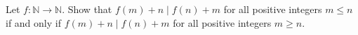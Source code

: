 Let $f:\mathbb N\to \mathbb N$. Show that $f(m)+n\mid f(n)+m$ for all positive integers $m\le n$ if and only if $f(m)+n\mid f(n)+m$ for all positive integers $m\ge n$.

